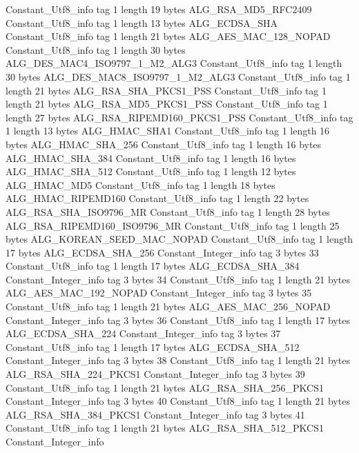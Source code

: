 {{{		}
		Constant_Utf8_info {
			tag	1
			length	19
			bytes	ALG_RSA_MD5_RFC2409
		}
		Constant_Utf8_info {
			tag	1
			length	13
			bytes	ALG_ECDSA_SHA
		}
		Constant_Utf8_info {
			tag	1
			length	21
			bytes	ALG_AES_MAC_128_NOPAD
		}
		Constant_Utf8_info {
			tag	1
			length	30
			bytes	ALG_DES_MAC4_ISO9797_1_M2_ALG3
		}
		Constant_Utf8_info {
			tag	1
			length	30
			bytes	ALG_DES_MAC8_ISO9797_1_M2_ALG3
		}
		Constant_Utf8_info {
			tag	1
			length	21
			bytes	ALG_RSA_SHA_PKCS1_PSS
		}
		Constant_Utf8_info {
			tag	1
			length	21
			bytes	ALG_RSA_MD5_PKCS1_PSS
		}
		Constant_Utf8_info {
			tag	1
			length	27
			bytes	ALG_RSA_RIPEMD160_PKCS1_PSS
		}
		Constant_Utf8_info {
			tag	1
			length	13
			bytes	ALG_HMAC_SHA1
		}
		Constant_Utf8_info {
			tag	1
			length	16
			bytes	ALG_HMAC_SHA_256
		}
		Constant_Utf8_info {
			tag	1
			length	16
			bytes	ALG_HMAC_SHA_384
		}
		Constant_Utf8_info {
			tag	1
			length	16
			bytes	ALG_HMAC_SHA_512
		}
		Constant_Utf8_info {
			tag	1
			length	12
			bytes	ALG_HMAC_MD5
		}
		Constant_Utf8_info {
			tag	1
			length	18
			bytes	ALG_HMAC_RIPEMD160
		}
		Constant_Utf8_info {
			tag	1
			length	22
			bytes	ALG_RSA_SHA_ISO9796_MR
		}
		Constant_Utf8_info {
			tag	1
			length	28
			bytes	ALG_RSA_RIPEMD160_ISO9796_MR
		}
		Constant_Utf8_info {
			tag	1
			length	25
			bytes	ALG_KOREAN_SEED_MAC_NOPAD
		}
		Constant_Utf8_info {
			tag	1
			length	17
			bytes	ALG_ECDSA_SHA_256
		}
		Constant_Integer_info {
			tag	3
			bytes	33
		}
		Constant_Utf8_info {
			tag	1
			length	17
			bytes	ALG_ECDSA_SHA_384
		}
		Constant_Integer_info {
			tag	3
			bytes	34
		}
		Constant_Utf8_info {
			tag	1
			length	21
			bytes	ALG_AES_MAC_192_NOPAD
		}
		Constant_Integer_info {
			tag	3
			bytes	35
		}
		Constant_Utf8_info {
			tag	1
			length	21
			bytes	ALG_AES_MAC_256_NOPAD
		}
		Constant_Integer_info {
			tag	3
			bytes	36
		}
		Constant_Utf8_info {
			tag	1
			length	17
			bytes	ALG_ECDSA_SHA_224
		}
		Constant_Integer_info {
			tag	3
			bytes	37
		}
		Constant_Utf8_info {
			tag	1
			length	17
			bytes	ALG_ECDSA_SHA_512
		}
		Constant_Integer_info {
			tag	3
			bytes	38
		}
		Constant_Utf8_info {
			tag	1
			length	21
			bytes	ALG_RSA_SHA_224_PKCS1
		}
		Constant_Integer_info {
			tag	3
			bytes	39
		}
		Constant_Utf8_info {
			tag	1
			length	21
			bytes	ALG_RSA_SHA_256_PKCS1
		}
		Constant_Integer_info {
			tag	3
			bytes	40
		}
		Constant_Utf8_info {
			tag	1
			length	21
			bytes	ALG_RSA_SHA_384_PKCS1
		}
		Constant_Integer_info {
			tag	3
			bytes	41
		}
		Constant_Utf8_info {
			tag	1
			length	21
			bytes	ALG_RSA_SHA_512_PKCS1
		}
		Constant_Integer_info {
}}}

